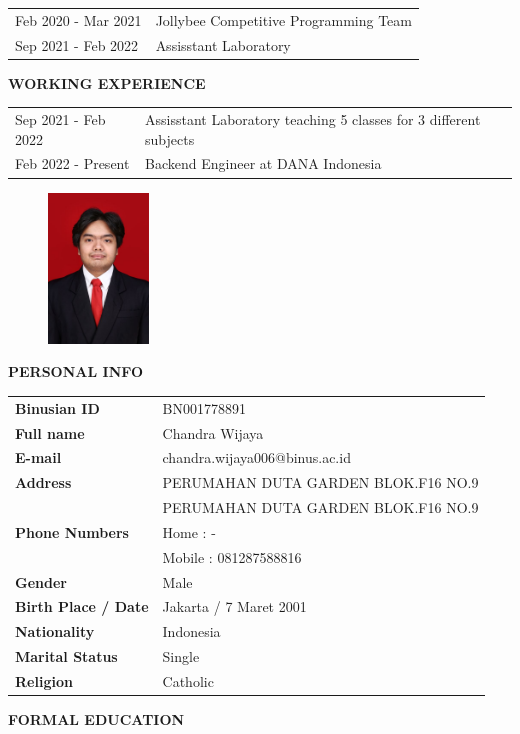 \documentclass[a4paper]{article}
\begin{document}
\begin{center}
\begin{longtable}[c]{p{5cm}p{7cm}}
   Feb 2020 - Mar 2021 & Jollybee Competitive Programming Team\\
   Sep 2021 - Feb 2022 & Assisstant Laboratory\\
\end{longtable}
\end{center}
\textbf{WORKING EXPERIENCE}

\begin{center}
\begin{longtable}[c]{p{5cm}p{7cm}}
   Sep 2021 - Feb 2022 & Assisstant Laboratory \newline teaching 5 classes for 3 different subjects\\
   Feb 2022 - Present & Backend Engineer at DANA Indonesia\\
\end{longtable}
\end{center}

\newpage
\begin{figure}[h]
    \includegraphics*[height=4cm]{./images/foto/chandra.jpg}
    \centering
\end{figure}

\noindent\textbf{PERSONAL INFO}

\begin{center}
\begin{longtable}[c]{p{5cm}p{7cm}}
    \textbf{Binusian ID} & BN001778891\\
    \textbf{Full name} & Chandra Wijaya\\
    \textbf{E-mail} & chandra.wijaya006@binus.ac.id\\
    \textbf{Address} & PERUMAHAN DUTA GARDEN BLOK.F16 NO.9\\
     & PERUMAHAN DUTA GARDEN BLOK.F16 NO.9\\
    \textbf{Phone Numbers} & Home   : -\\
                           & Mobile : 081287588816\\
    \textbf{Gender} & Male\\
    \textbf{Birth Place / Date} & Jakarta / 7 Maret 2001\\
    \textbf{Nationality} & Indonesia\\
    \textbf{Marital Status} & Single\\
    \textbf{Religion} & Catholic\\
\end{longtable}
\end{center}
\newpage
\noindent\textbf{FORMAL EDUCATION}
\end{document}
